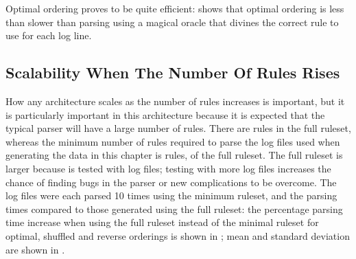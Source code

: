 Optimal ordering proves to be quite efficient:  shows that optimal ordering is less than
 slower than parsing
using a magical oracle that divines the correct rule to use for each log
line.






\FloatBarrier{}

\subsection{Scalability When The Number Of Rules Rises}

\label{scalability as the number of rules rises}

How any architecture scales as the number of rules increases is important,
but it is particularly important in this architecture because it is
expected that the typical parser will have a large number of rules.  There
are \numberOFrules{} rules in the full \parsername{} ruleset, whereas the
minimum number of rules required to parse the \numberOFlogFILES{} log files
used when generating the data in this chapter is \numberOFrulesMINIMUM{}
rules, \numberOFrulesMINIMUMpercentage{} of the full ruleset.  The full
ruleset is larger because \parsername{} is tested with
\numberOFlogFILESall{} log files; testing with more log files increases the
chance of finding bugs in the parser or new complications to be overcome.
The \numberOFlogFILES{} log files were each parsed 10 times using the
minimum ruleset, and the parsing times compared to those generated using
the full ruleset: the percentage parsing time increase when using the full
ruleset instead of the minimal ruleset for optimal, shuffled and reverse
orderings is shown in ; mean and standard deviation are shown in
.

